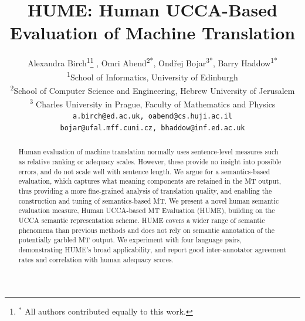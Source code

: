 \documentclass[11pt,letterpaper]{article}
\title{HUME: Human UCCA-Based Evaluation of Machine Translation}
\author{
  Alexandra Birch\textsuperscript{1}\thanks{$^*$ All authors contributed equally to this work.} , Omri Abend\textsuperscript{2*}, Ond{\v{r}}ej Bojar\textsuperscript{3*},
  Barry Haddow\textsuperscript{1*}\\
\textsuperscript{1}School of Informatics, University of Edinburgh\\
\textsuperscript{2}School of Computer Science and Engineering, Hebrew University of Jerusalem\\
\textsuperscript{3} Charles University in Prague, Faculty of Mathematics and Physics\\
\texttt{a.birch@ed.ac.uk, oabend@cs.huji.ac.il}\\
\texttt{bojar@ufal.mff.cuni.cz, bhaddow@inf.ed.ac.uk}\\
}
\date{}
\begin{document}
\maketitle

\begin{abstract}
  

Human evaluation of machine translation normally uses sentence-level measures such as relative ranking or adequacy scales. However, these provide no insight into possible errors,
and do not scale well with sentence length.
We argue for a semantics-based evaluation, which captures what meaning components
are retained in the MT output, thus providing a more fine-grained analysis of
translation quality, and enabling the construction and tuning of semantics-based MT. 
We present a novel human semantic evaluation measure, Human
UCCA-based MT Evaluation (HUME), building on the UCCA semantic representation scheme.
HUME covers
a wider range of semantic phenomena than previous methods and does not rely on semantic annotation
of the potentially garbled MT output. 
We experiment with four language pairs, demonstrating HUME's broad applicability,
and report good
inter-annotator agreement rates and 
 correlation with human adequacy scores.



\end{abstract}
\end{document}

